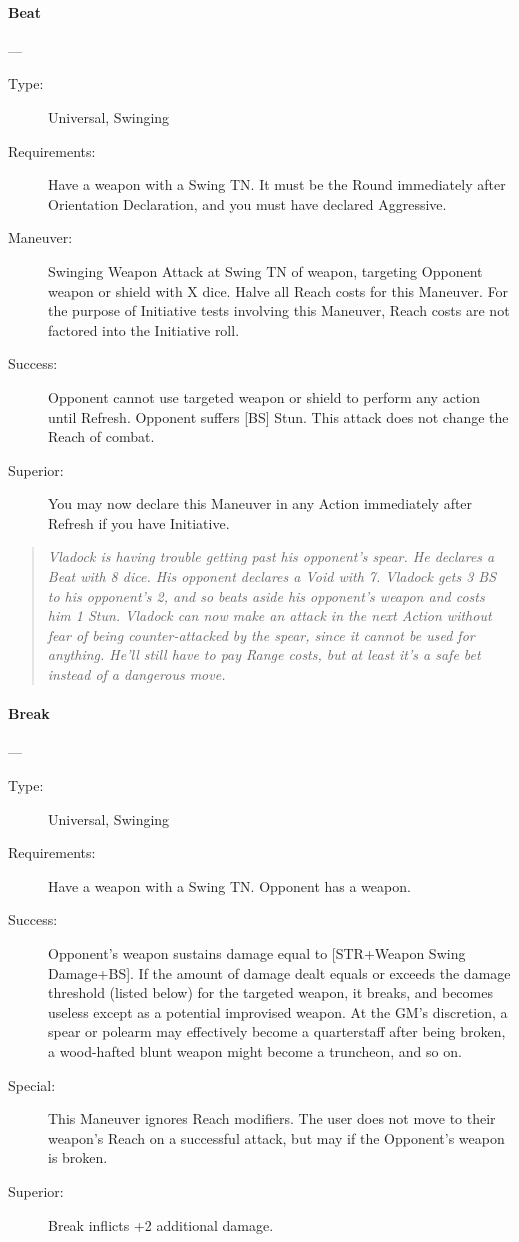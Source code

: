 \documentclass[oneside,11pt,english]{book}
\begin{document}
\paragraph{\large\label{man:Beat}Beat}---\quad{\large[X]}
\vspace{-10pt}\begin{description}
\item [Type:] Universal, Swinging
\item [Requirements:] Have a weapon with a Swing TN. It must be the Round immediately after Orientation Declaration, and you must have declared Aggressive.
\item [Maneuver:] Swinging Weapon Attack at Swing TN of weapon, targeting Opponent weapon or shield with X dice. Halve all Reach costs for this Maneuver. For the purpose of Initiative tests involving this Maneuver, Reach costs are not factored into the Initiative roll. 
\item [Success:] Opponent cannot use targeted weapon or shield to perform any action until Refresh. Opponent suffers [BS] Stun. This attack does not change the Reach of combat. 
\item [Superior:] You may now declare this Maneuver in any Action immediately after Refresh if you have Initiative. 
\end{description}
\begin{quotation}
\emph{Vladock is having trouble getting past his opponent’s spear. He declares a Beat with 8 dice. His opponent declares a Void with 7. Vladock gets 3 BS to his opponent’s 2, and so beats aside his opponent’s weapon and costs him 1 Stun. Vladock can now make an attack in the next Action without fear of being counter-attacked by the spear, since it cannot be used for anything. He’ll still have to pay Range costs, but at least it’s a safe bet instead of a dangerous move. }
\end{quotation}

\paragraph{\large\label{man:Break}Break}---\quad{\large[X$ + $2]}
	\vspace{-10pt}
\begin{description}
	\item[Type:] Universal, Swinging
	\item[Requirements:] Have a weapon with a Swing TN. Opponent has a weapon.
	\item[Success:] Opponent’s weapon sustains damage equal to [STR+Weapon Swing Damage+BS]. If the amount of damage dealt equals or exceeds the damage threshold (listed below) for the targeted weapon, it breaks, and becomes useless except as a potential improvised weapon. At the GM’s discretion, a spear or polearm may effectively become a quarterstaff after being broken, a wood-hafted blunt weapon might become a truncheon, and so on. 
	\item[Special:] This Maneuver ignores Reach modifiers. The user does not move to their weapon’s Reach on a successful attack, but may if the Opponent’s weapon is broken. 
	\item[Superior:] Break inflicts +2 additional damage. 
\end{description}
\end{document}
